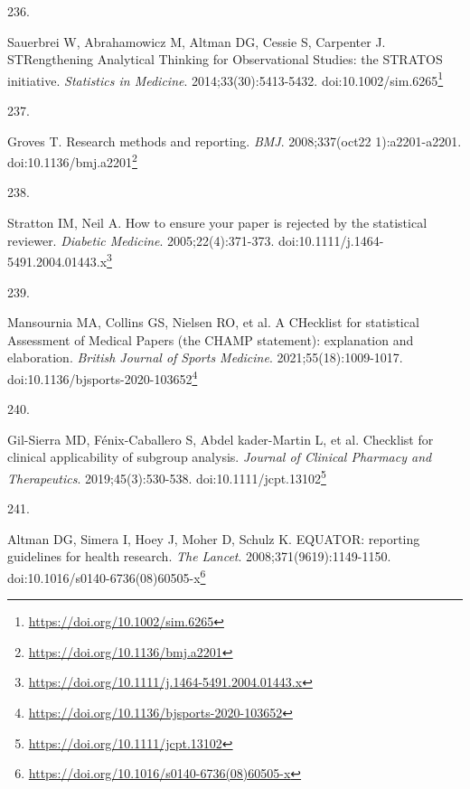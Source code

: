 \documentclass[
  a4paper,
]{book}
\newlength{\cslhangindent}
\newlength{\csllabelwidth}
\newlength{\cslentryspacingunit} %
\newenvironment{CSLReferences}[2] %
 {%
  \setlength{\parindent}{0pt}
  \ifodd #1
  \let\oldpar\par
  \def\par{\hangindent=\cslhangindent\oldpar}
  \fi
  \setlength{\parskip}{#2\cslentryspacingunit}
 }%
 {}
\newcommand{\CSLLeftMargin}[1]{\parbox[t]{\csllabelwidth}{#1}}
\newcommand{\CSLRightInline}[1]{\parbox[t]{\linewidth - \csllabelwidth}{#1}\break}
\renewcommand{\href}[2]{#2\footnote{\url{#1}}}
\begin{document}
\begin{CSLReferences}{0}{0}
\leavevmode{}%
\CSLLeftMargin{236. }%
\CSLRightInline{Sauerbrei W, Abrahamowicz M, Altman DG, Cessie S, Carpenter J. STRengthening Analytical Thinking for Observational Studies: the STRATOS initiative. \emph{Statistics in Medicine}. 2014;33(30):5413-5432. doi:\href{https://doi.org/10.1002/sim.6265}{10.1002/sim.6265}}

\leavevmode{}%
\CSLLeftMargin{237. }%
\CSLRightInline{Groves T. Research methods and reporting. \emph{BMJ}. 2008;337(oct22 1):a2201-a2201. doi:\href{https://doi.org/10.1136/bmj.a2201}{10.1136/bmj.a2201}}

\leavevmode{}%
\CSLLeftMargin{238. }%
\CSLRightInline{Stratton IM, Neil A. How to ensure your paper is rejected by the statistical reviewer. \emph{Diabetic Medicine}. 2005;22(4):371-373. doi:\href{https://doi.org/10.1111/j.1464-5491.2004.01443.x}{10.1111/j.1464-5491.2004.01443.x}}

\leavevmode{}%
\CSLLeftMargin{239. }%
\CSLRightInline{Mansournia MA, Collins GS, Nielsen RO, et al. A CHecklist for statistical Assessment of Medical Papers (the CHAMP statement): explanation and elaboration. \emph{British Journal of Sports Medicine}. 2021;55(18):1009-1017. doi:\href{https://doi.org/10.1136/bjsports-2020-103652}{10.1136/bjsports-2020-103652}}

\leavevmode{}%
\CSLLeftMargin{240. }%
\CSLRightInline{Gil-Sierra MD, Fénix-Caballero S, Abdel kader-Martin L, et al. Checklist for clinical applicability of subgroup analysis. \emph{Journal of Clinical Pharmacy and Therapeutics}. 2019;45(3):530-538. doi:\href{https://doi.org/10.1111/jcpt.13102}{10.1111/jcpt.13102}}

\leavevmode{}%
\CSLLeftMargin{241. }%
\CSLRightInline{Altman DG, Simera I, Hoey J, Moher D, Schulz K. EQUATOR: reporting guidelines for health research. \emph{The Lancet}. 2008;371(9619):1149-1150. doi:\href{https://doi.org/10.1016/s0140-6736(08)60505-x}{10.1016/s0140-6736(08)60505-x}}

\end{CSLReferences}


\end{document}
